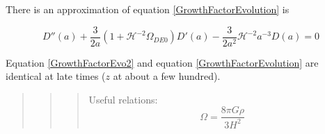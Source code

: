 \documentclass{article}
\begin{document}
{There is an approximation of equation \ref{GrowthFactorEvolution} is

\begin{equation}
D''(a)+\frac{3}{2a}(1+\mathcal {H}^{-2}\Omega_{DE0})D'(a)-\frac{3}{2a^2}\mathcal H^{-2}a^{-3}D(a)=0\label{GrowthFactorEvo2}
\end{equation}

Equation \ref{GrowthFactorEvo2} and equation \ref{GrowthFactorEvolution} are identical at late times ($z$ at about a few hundred).



\begin{quote}
\begin{quote}
\begin{quote}
Useful relations:
\begin{equation}
\Omega=\frac{8\pi G\rho}{3H^2}
\end{equation}

\end{quote}
\end{quote}
\end{quote}



}  
\end{document}
